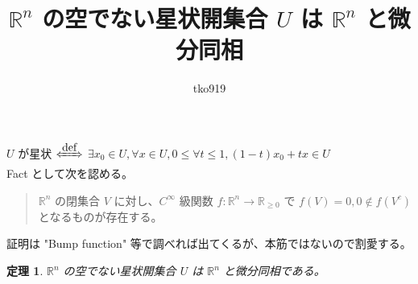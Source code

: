 \documentclass[a4paper,10pt]{jsarticle}
\newtheorem{thm}{定理}[section]
\begin{document}
\title{$\mathbb{R}^n$ の空でない星状開集合 $U$ は $\mathbb{R}^n$ と微分同相}
\author{tko919}
\date{}
\maketitle

$U$ が星状 $\xLeftrightarrow{\mbox{def}}$ $\exists x_0 \in U,\forall x \in U,0 \leq \forall t \leq 1,(1-t)x_0+tx \in U$ \\

Fact として次を認める。
\begin{quote}
  $\mathbb{R}^n$ の閉集合 $V$ に対し、$C^\infty$ 級関数 $f:\mathbb{R}^n\to \mathbb{R}_{\geq 0}$ で $f(V)=0,0 \notin f(V^c)$ となるものが存在する。
\end{quote}
証明は "Bump function" 等で調べれば出てくるが、本筋ではないので割愛する。 \\

\begin{thm}
  $\mathbb{R}^n$ の空でない星状開集合 $U$ は $\mathbb{R}^n$ と微分同相である。
\end{thm}
\end{document}
